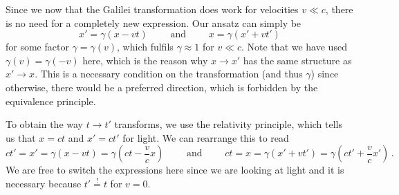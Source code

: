 Since we now that the Galilei transformation does work for velocities $v \ll c$, there is no need for a completely new expression. Our ansatz can simply be
\begin{equation}\label{eq:lorentz_spatial_ansatz}
x' = \gamma (x - vt)
\qquad \text{ and } \qquad
x = \gamma (x' + vt')
\end{equation}
for some factor $\gamma = \gamma(v)$, which fulfils $\gamma \approx 1$ for $v \ll c$. Note that we have used $\gamma(v) = \gamma(-v)$ here, which is the reason why $x \rightarrow x'$ has the same structure as $x' \rightarrow x$. This is a necessary condition on the transformation (and thus $\gamma$) since otherwise, there would be a preferred direction, which is forbidden by the equivalence principle.

To obtain the way $t \rightarrow t'$ transforms, we use the relativity principle, which tells us that $x = ct$ and $x' = ct'$ for light. We can rearrange this to read
\begin{equation}\label{eq:lorentz_time_ansatz}
ct' = x' = \gamma (x - vt) = \gamma (ct - \frac{v}{c} x)
\qquad \text{ and } \qquad
ct = x = \gamma (x' + vt') = \gamma (ct' + \frac{v}{c} x') \, .
\end{equation}
We are free to switch the expressions here since we are looking at light and it is necessary because $t' \overset{!}{=} t$ for $v = 0$.

